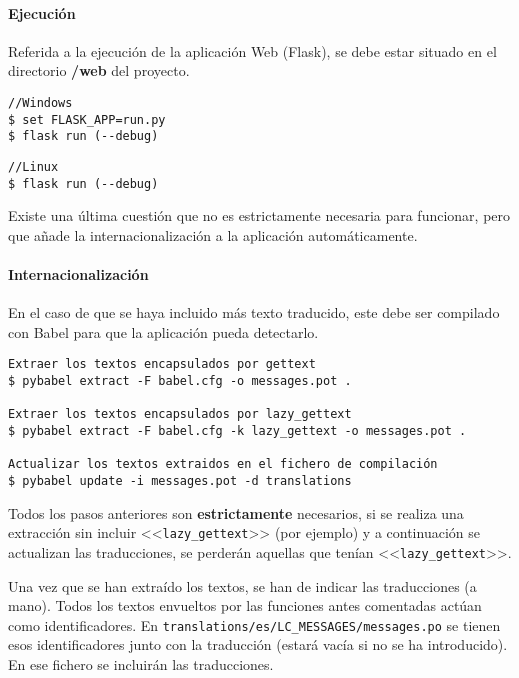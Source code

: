 \paragraph{Ejecución} Referida a la ejecución de la aplicación Web (Flask), se
debe estar situado en el directorio \textbf{/web} del proyecto.
\begin{tcolorbox}[colback=cyan!5!white,colframe=cyan!75!black,fontupper=\footnotesize,fontlower=\footnotesize,title=Ejecución]
\begin{verbatim}
//Windows
$ set FLASK_APP=run.py
$ flask run (--debug)
\end{verbatim}
\tcblower
\begin{verbatim}
//Linux
$ flask run (--debug)
\end{verbatim}
\end{tcolorbox}

Existe una última cuestión que no es estrictamente necesaria para funcionar,
pero que añade la internacionalización a la aplicación automáticamente.

\paragraph{Internacionalización} En el caso de que se haya incluido más texto
traducido, este debe ser compilado con Babel para que la aplicación pueda
detectarlo.

\begin{tcolorbox}[colback=cyan!5!white,colframe=cyan!75!black,fontupper=\footnotesize,title=Proceso de internacionalización (desde \texttt{/web/app})]
\begin{verbatim}
Extraer los textos encapsulados por gettext
$ pybabel extract -F babel.cfg -o messages.pot .

Extraer los textos encapsulados por lazy_gettext
$ pybabel extract -F babel.cfg -k lazy_gettext -o messages.pot .

Actualizar los textos extraidos en el fichero de compilación
$ pybabel update -i messages.pot -d translations
\end{verbatim}
\end{tcolorbox}

Todos los pasos anteriores son \textbf{estrictamente} necesarios, si se realiza
una extracción sin incluir <<\texttt{lazy\_gettext}>> (por ejemplo) y a
continuación se actualizan las traducciones, se perderán aquellas que tenían
<<\texttt{lazy\_gettext}>>.

Una vez que se han extraído los textos, se han de indicar las traducciones (a
mano). Todos los textos envueltos por las funciones antes comentadas actúan como
identificadores. En \texttt{translations/es/LC\_MESSAGES/messages.po} se tienen
esos identificadores junto con la traducción (estará vacía si no se ha
introducido). En ese fichero se incluirán las traducciones.

